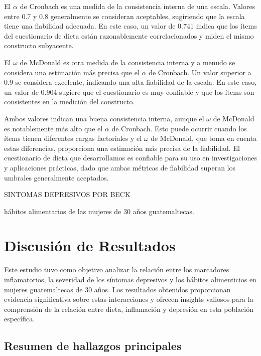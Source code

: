 \documentclass[jou]{apa7}
\begin{document}
	El $\alpha$ de Cronbach es una medida de la consistencia interna de una escala.
	Valores entre 0.7 y 0.8 generalmente se consideran aceptables,
	sugiriendo que la escala tiene una fiabilidad adecuada. En este caso, un
	valor de 0.741 indica que los ítems del cuestionario de dieta están
	razonablemente correlacionados y miden el mismo constructo subyacente.
	
	El $\omega$ de McDonald es otra medida de la consistencia interna y a menudo se
	considera una estimación más precisa que el $\alpha$ de Cronbach. Un valor
	superior a 0.9 se considera excelente, indicando una alta fiabilidad de
	la escala. En este caso, un valor de 0.904 sugiere que el cuestionario
	es muy confiable y que los ítems son consistentes en la medición del
	constructo.
	
	Ambos valores indican una buena consistencia interna, aunque el $\omega$ de
	McDonald es notablemente más alto que el $\alpha$ de Cronbach. Esto puede
	ocurrir cuando los ítems tienen diferentes cargas factoriales y el $\omega$ de
	McDonald, que toma en cuenta estas diferencias, proporciona una
	estimación más precisa de la fiabilidad. El cuestionario de dieta que
	desarrollamos es confiable para su uso en investigaciones y aplicaciones
	prácticas, dado que ambas métricas de fiabilidad superan los umbrales
	generalmente aceptados.
	
	SINTOMAS DEPRESIVOS POR BECK
	
	hábitos alimentarios de las mujeres de 30 años guatemaltecas.
	
	\section{Discusión de Resultados}\label{discusiuxf3n-de-resultados}
	
	Este estudio tuvo como objetivo analizar la relación entre los
	marcadores inflamatorios, la severidad de los síntomas depresivos y los
	hábitos alimenticios en mujeres guatemaltecas de 30 años. Los resultados
	obtenidos proporcionan evidencia significativa sobre estas interacciones
	y ofrecen insights valiosos para la comprensión de la relación entre
	dieta, inflamación y depresión en esta población específica.
	
	\subsection{Resumen de hallazgos principales}\label{resumen-de-hallazgos-principales}
	
\end{document}
